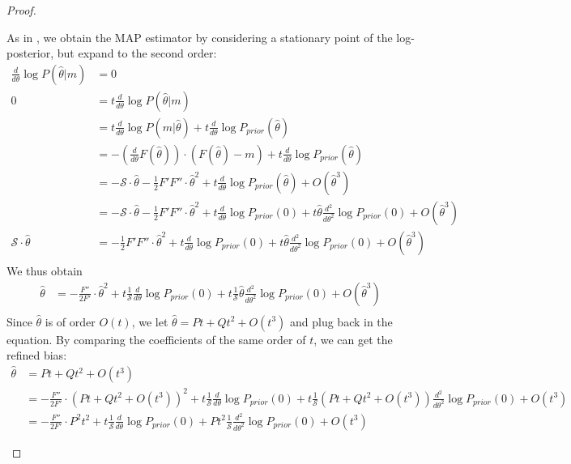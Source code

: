 \begin{proof}
\begin{itemize}
As in \cite{Stocker2006NoiseCA,hahn2024unifying}, we obtain the MAP estimator by considering a stationary point of the log-posterior, but expand to the second order:
    \begin{align*}
    \frac{d}{d \theta} \log P(\widehat{\theta}|m) &= 0\\
    0 &= t \frac{d}{d \theta} \log P(\widehat{\theta}|m)\\
    &= t \frac{d}{d \theta} \log P(m|\widehat{\theta}) + t \frac{d}{d \theta} \log P_{prior}(\widehat{\theta})\\
    &= -(\frac{d}{d \theta} F(\widehat{\theta})) \cdot (F(\widehat{\theta}) - m) + t \frac{d}{d \theta} \log P_{prior}(\widehat{\theta})\\
    &= -\mathcal{S} \cdot \widehat{\theta} - \frac{1}{2}F'F'' \cdot \widehat{\theta}^2 + t \frac{d}{d \theta} \log P_{prior}(\widehat{\theta}) + O(\widehat{\theta}^3)\\
    &= -\mathcal{S} \cdot \widehat{\theta} - \frac{1}{2}F'F'' \cdot \widehat{\theta}^2 + t \frac{d}{d \theta} \log P_{prior}(0) + t\widehat{\theta} \frac{d^2}{d \theta^2} \log P_{prior}(0) + O(\widehat{\theta}^3)\\
    \mathcal{S} \cdot \widehat{\theta} &= - \frac{1}{2}F'F'' \cdot \widehat{\theta}^2 + t \frac{d}{d \theta} \log P_{prior}(0) + t\widehat{\theta} \frac{d^2}{d \theta^2} \log P_{prior}(0) + O(\widehat{\theta}^3)\\
    \end{align*}
    We thus obtain
    \begin{align*}
    \widehat{\theta} &= - \frac{F''}{2F'} \cdot \widehat{\theta}^2 + t \frac{1}{\mathcal{S}} \frac{d}{d \theta} \log P_{prior}(0) + t \frac{1}{\mathcal{S}} \widehat{\theta} \frac{d^2}{d \theta^2} \log P_{prior}(0) + O(\widehat{\theta}^3)\\
\end{align*}
Since $\widehat{\theta}$ is of order $O(t)$, we let $\widehat{\theta} = Pt + Qt^2 + O(t^3)$ and plug back in the equation. By comparing the coefficients of the same order of $t$, we can get the refined bias:
\begin{align*}
    \widehat{\theta} &= Pt + Qt^2 + O(t^3)\\
    &= - \frac{F''}{2F'} \cdot (Pt + Qt^2 + O(t^3))^2 + t \frac{1}{\mathcal{S}} \frac{d}{d \theta} \log P_{prior}(0) + t \frac{1}{\mathcal{S}} (Pt + Qt^2 + O(t^3)) \frac{d^2}{d \theta^2} \log P_{prior}(0) + O(t^3)\\
    &= - \frac{F''}{2F'} \cdot P^2t^2 + t \frac{1}{\mathcal{S}} \frac{d}{d \theta} \log P_{prior}(0) + Pt^2 \frac{1}{\mathcal{S}}  \frac{d^2}{d \theta^2} \log P_{prior}(0) + O(t^3)

\end{align*}
\end{itemize}
\end{proof}
